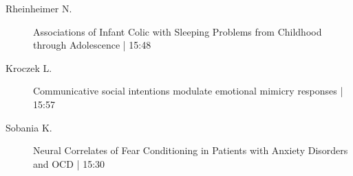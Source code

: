 \begin{symposium}
\begin{description}
                \item [ Rheinheimer N.] Associations of Infant Colic with Sleeping Problems from Childhood through Adolescence \textcolor{mygray}{ | 15:48}    
                
                \item [ Kroczek L.] Communicative social intentions modulate emotional mimicry responses \textcolor{mygray}{ | 15:57}    
                
                \item [ Sobania K.] Neural Correlates of Fear Conditioning in Patients with Anxiety Disorders and OCD \textcolor{mygray}{ | 15:30}    
                
            \end{description} 
            \end{symposium}
            